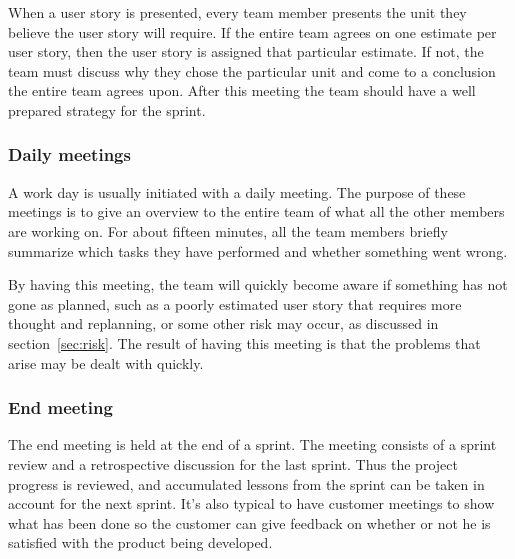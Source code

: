 
When a user story is presented, every team member presents the unit they believe the user story will require. If the entire team agrees on one estimate per user story, then the user story is assigned that particular estimate. If not, the team must discuss why they chose the particular unit and come to a conclusion the entire team agrees upon.
After this meeting the team should have a well prepared strategy for the sprint.

\subsubsection{Daily meetings}
A work day is usually initiated with a daily meeting. The purpose of these meetings is to give an overview to the entire team of what all the other members are working on. For about fifteen minutes, all the team members briefly summarize which tasks they have performed and whether something went wrong.

By having this meeting, the team will quickly become aware if something has not gone as planned, such as a poorly estimated user story that requires more thought and replanning, or some other risk may occur, as discussed in section~\ref{sec:risk}. The result of having this meeting is that the problems that arise may be dealt with quickly.

\subsubsection{End meeting}
The end meeting is held at the end of a sprint. The meeting consists of a sprint review and a retrospective discussion for the last sprint.
Thus the project progress is reviewed, and accumulated lessons from the sprint can be taken in account for the next sprint.
It's also typical to have customer meetings to show what has been done so the customer can give feedback on whether or not he is satisfied with the product being developed.


